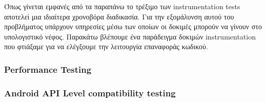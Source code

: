 		Όπως γίνεται εμφανές από τα παραπάνω το τρέξιμο των instrumentation tests αποτελεί μια ιδιαίτερα χρονοβόρα διαδικασία. Για την εξομάλυνση αυτού του προβλήματος υπάρχουν υπηρεσίες μέσω των οποίων οι δοκιμές μπορούν να γίνουν στο υπολογιστικό νέφος. Παρακάτω βλέπουμε ένα παράδειγμα δοκιμών instrumentation που φτιάξαμε για να ελέγξουμε την λειτουργία επαναφοράς κωδικού.
		
		
		\subsubsection{Performance Testing}
		\subsubsection{Android API Level compatibility testing}

